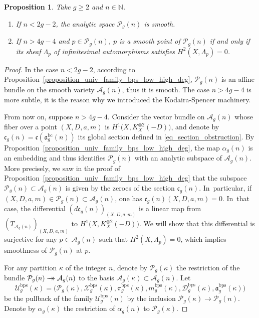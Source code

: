\documentclass[JEP,XML,SOM,Unicode,NoEqCountersInSection,published]{cedram}
\newcommand{\onto}{\mathchoice{\to\hspace*{-5mm}\to}{\to\hspace*{-2.85mm}\to}{\to\hspace*{-3mm}\to}{\to\hspace*{-3mm}\to}}
\newcommand{\N}{\mathbb N}
\newcommand{\BC}{\mathrm{bc}}
\newcommand{\BPS}{\mathrm{bps}}
\theoremstyle{definition}
\theoremstyle{plain}
\newtheorem{proposition}[definition]{Proposition}
\begin{document}
\begin{proposition}\label{proposition_singular_points_small_high_degree}
Take $g \ge 2$ and $n \in \N$.
\begin{enumerate}
\item
If $n < 2g-2$, the analytic space $\mathcal P_g(n)$ is smooth.
\item
If $n > 4g-4$ and $p \in \mathcal P_g(n)$, $p$ is a smooth point of $\mathcal P_g(n)$ if and only if its sheaf $\Lambda_p$ of infinitesimal automorphisms satisfies $H^2\left(X, \Lambda_p\right) = 0$.
\end{enumerate}
\end{proposition}

\begin{proof}
In the case $n<2g-2$, according to Proposition~\ref{proposition_univ_family_bps_low_high_deg}, $\mathcal P_g(n)$ is an affine bundle on the smooth variety $\mathcal A_g(n)$, thus it is smooth.
The case $n > 4g-4$ is more subtle, it is the reason why we introduced the Kodaira-Spencer machinery.

From now on, suppose $n > 4g-4$.
Consider the vector bundle on $\mathcal A_g(n)$ whose fiber over a point $(X, D, a, m)$ is $H^1\bigl(X, K_X^{\otimes 2}(-D)\bigr)$, and denote by $\mathfrak c_g(n) = \mathfrak c\left(\mathfrak a_g^{\BC}(n)\right)$ its global section defined in \eqref{eq_section_obstruction}.
By Proposition~\ref{proposition_univ_family_bps_low_high_deg}, the map $\alpha_g(n)$ is an embedding and thus identifies $\mathcal P_g(n)$ with an analytic subspace of $\mathcal A_g(n)$.
More precisely, we saw in the proof of Proposition~\ref{proposition_univ_family_bps_low_high_deg} that the subspace $\mathcal P_g(n) \subset \mathcal A_g(n)$ is given by the zeroes of the section $\mathfrak c_g(n)$. In~particular, if $(X, D, a, m) \in \mathcal P_g(n) \subset \mathcal A_g(n)$, one has $\mathfrak c_g(n)(X, D, a, m) = 0$. In~that case, the differential $(d \mathfrak c_g(n))_{(X, D, a, m)}$ is a linear map from $(T_{\mathcal A_g(n)})_{(X, D, a, m)}$ to $H^1\bigl(X, K_X^{\otimes 2}(-D)\bigr)$.
We will show that this differential is surjective for any $p \in \mathcal A_g(n)$ such that $H^2(X, \Lambda_p)=0$, which implies smoothness of $\mathcal P_g(n)$ at $p$.

For any partition $\kappa$ of the integer $n$, denote by $\mathcal P_g(\kappa)$ the restriction of the bundle $\mathcal P_g(n) \onto \mathcal A_g(n)$ to the basis $\mathcal A_g(\kappa) \subset \mathcal A_g(n)$.
Let
\[
\mathcal U_g^{\BPS}(\kappa) = \big(\mathcal P_g(\kappa), \mathcal X^{\BPS}_g(\kappa), \pi_g^{\BPS}(\kappa), m_g^{\BPS}(\kappa), \mathcal D_g^{\BPS}(\kappa), \mathfrak a_g^{\BPS}(\kappa)\big)
\]
be the pullback of the family $\mathcal U_g^{\BPS}(n)$ by the inclusion $\mathcal P_g(\kappa) \to \mathcal P_g(n)$.
Denote by $\alpha_g(\kappa)$ the restriction of $\alpha_g(n)$ to $\mathcal P_g(\kappa)$.


\end{proof}
\end{document}
